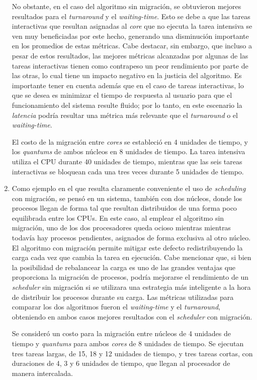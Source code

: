 \begin{enumerate}
    No obstante, en el caso del algoritmo sin migración, se obtuvieron mejores
    resultados para el \emph{turnaround} y el \emph{waiting-time}. Esto se
    debe a que las tareas interactivas que resultan asignadas al \emph{core}
    que no ejecuta la tarea intensiva se ven muy beneficiadas por este hecho,
    generando una disminución importante en los promedios de estas métricas.
    Cabe destacar, sin embargo, que incluso a pesar de estos resultados, las
    mejores métricas alcanzadas por algunas de las tareas interactivas tienen
    como contrapeso un peor rendimiento por parte de las otras, lo cual tiene
    un impacto negativo en la justicia del algoritmo. Es importante tener en
    cuenta además que en el caso de tareas interactivas, lo que se desea es
    minimizar el tiempo de respuesta al usuario para que el funcionamiento del
    sistema resulte fluido; por lo tanto, en este escenario la \emph{latencia}
    podría resultar una métrica más relevante que el \emph{turnaround} o el
    \emph{waiting-time}.

    El costo de la migración entre \emph{cores} se estableció en 4 unidades de
    tiempo, y los \emph{quantums} de ambos núcleos en 8 unidades de tiempo. La
    tarea intensiva utiliza el CPU durante 40 unidades de tiempo, mientras que
    las seis tareas interactivas se bloquean cada una tres veces durante 5
    unidades de tiempo.

    \item Como ejemplo en el que resulta claramente conveniente el uso de
    \emph{scheduling} con migración, se pensó en un sistema, también con dos
    núcleos, donde los procesos llegan de forma tal que resultan distribuidos
    de una forma poco equilibrada entre los CPUs. En este caso, al emplear el
    algoritmo sin migración, uno de los dos procesadores queda ocioso mientras
    mientras todavía hay procesos pendientes, asignados de forma exclusiva al
    otro núcleo. El algoritmo con migración permite mitigar este defecto
    redistribuyendo la carga cada vez que cambia la tarea en ejecución. Cabe
    mencionar que, si bien la posibilidad de rebalancear la carga es uno de
    las grandes ventajas que proporciona la migración de procesos, podría
    mejorarse el rendimiento de un \emph{scheduler} sin migración si se
    utilizara una estrategia más inteligente a la hora de distribuir los
    procesos durante su carga. Las métricas utilizadas para comparar los dos
    algoritmos fueron el \emph {waiting-time} y el \emph{turnaround},
    obteniendo en ambos casos mejores resultados con el \emph{scheduler} con
    migración.

    Se consideró un costo para la migración entre núcleos de 4 unidades de
    tiempo y \emph{quantums} para ambos \emph{cores} de 8 unidades de tiempo.
    Se ejecutan tres tareas largas, de 15, 18 y 12 unidades de tiempo, y tres
    tareas cortas, con duraciones de 4, 3 y 6 unidades de tiempo, que llegan
    al procesador de manera intercalada.
\end{enumerate}

